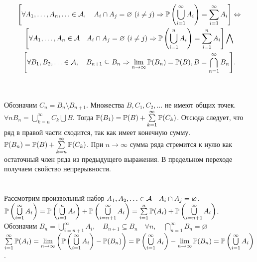 \documentclass[../TV&MS.tex]{subfiles}
\begin{document}
\begin{St}
    \begin{multline*}
    \Biggl[\forall A_1, \dots, A_n, \ldots \in \mathcal{A}, \quad A_i \cap A_j  = \varnothing\  (i \neq j)
	\Rightarrow \mathbb{P}\left(\bigcup\limits_{i=1}^{\infty} A_i\right) = \sum\limits_{i = 1}^{\infty} 
    A_i\Biggr] \Leftrightarrow \\ \Biggl[ \forall A_1, \dots, A_n \in \mathcal{A} \quad A_i \cap A_j  = \varnothing\  
	(i \neq j)  \Rightarrow \mathbb{P}\left(\bigcup\limits_{i=1}^{n} A_i\right) = \sum\limits_{i = 1}^{n} 
    A_i \Biggr] \bigwedge \\ \Biggl[ \forall B_1, B_2, \ldots \in \mathcal{A}, \quad B_{n+1} \subseteq B_n 
	\Rightarrow \lim\limits_{n \to \infty} \mathbb{P}(B_n) = \mathbb{P}(B), 
	B = \displaystyle\bigcap_{n=1}^\infty B_n\Biggr].
    \end{multline*}
\end{St}
\begin{Proof}
\\ \fbox{$\Rightarrow$}\\
Обозначим $C_n = B_n \setminus B_{n+1}$. Множества $B, C_1, C_2, \ldots$ не имеют общих точек.\\
$\forall n \! B_n =  \bigcup\limits_{k=n}^{\infty} C_k \bigcup B$. Тогда $\mathbb{P}(B_1) = \mathbb{P}(B) 
+ \sum\limits_{k=1}^{\infty} \mathbb{P}(C_k)$. Отсюда следует, что ряд в правой части сходится, так как 
имеет конечную сумму. $\mathbb{P}(B_n) = \mathbb{P}(B) + \sum\limits_{k=n}^{\infty} \mathbb{P}(C_k)$. При 
$n \to \infty$ сумма ряда стремится к нулю как остаточный член ряда из предыдущего выражения.
В предельном переходе получаем свойство непрерывности.
\\\\ \fbox{$\Leftarrow$}\\
Рассмотрим произвольный набор $A_1, A_2, \ldots \in \mathcal{A} \quad A_i\cap A_j = \varnothing$.\\
$\mathbb{P}\left(\bigcup\limits_{i=1}^{\infty} A_i\right) = \mathbb{P}\left(\bigcup\limits_{i=1}^{n} A_i\right) + 
\mathbb{P}\left(\bigcup\limits_{i=n + 1}^{\infty} A_i\right) =\sum\limits_{i = 1}^{n} \mathbb{P}(A_i) +  
\mathbb{P}\left(\bigcup\limits_{i=n + 1}^{\infty} A_i\right) $.\\
Обозначим $B_n = \bigcup\limits_{i=n + 1}^{\infty} A_i,\quad B_{n+1} \subseteq B_n 
\quad \forall n,\quad \bigcap\limits_{n=1}^{\infty} B_n= \varnothing$ \\
$\sum\limits_{i=1}^{\infty} \mathbb{P}(A_i) = \lim\limits_{n \to \infty} 
\left(\mathbb{P}\left(\bigcup\limits_{i=1}^{\infty} A_i\right) - \mathbb{P}(B_n)\right) = 
\mathbb{P}\left(\bigcup\limits_{i=1}^{\infty} A_i\right) 
- \lim\limits_{n \to \infty} \mathbb{P}(B_n) = \mathbb{P}\left(\bigcup\limits_{i=1}^{\infty} A_i\right)$.
\end{Proof}
\end{document}
